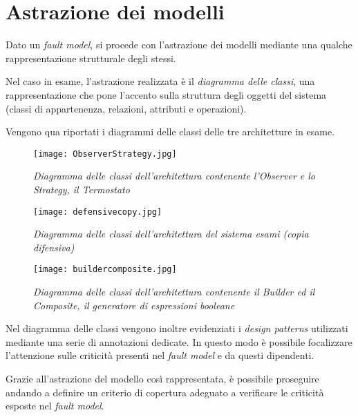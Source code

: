 \section{Astrazione dei modelli}

Dato un \emph{fault model}, si procede con l'astrazione dei modelli mediante una qualche rappresentazione strutturale degli stessi.

Nel caso in esame, l'astrazione realizzata è il \emph{diagramma delle classi}, una rappresentazione che pone l'accento sulla struttura degli oggetti del sistema (classi di appartenenza, relazioni, attributi e operazioni).

Vengono qua riportati i diagrammi delle classi delle tre architetture in esame.

\begin{figure}[h!] 
  \centering
    \texttt{[image: ObserverStrategy.jpg]}
    \caption{{\small \textit{Diagramma delle classi dell'architettura contenente l'Observer e lo Strategy, il Termostato}}}
\end{figure}

\begin{figure}[h!] 
  \centering
    \texttt{[image: defensivecopy.jpg]}
    \caption{{\small \textit{Diagramma delle classi dell'architettura del sistema esami (copia difensiva)}}}
\end{figure}

\begin{figure}[h!] 
  \centering
    \texttt{[image: buildercomposite.jpg]}
    \caption{{\small \textit{Diagramma delle classi dell'architettura contenente il Builder ed il Composite, il generatore di espressioni booleane}}}
\end{figure}

Nel diagramma delle classi vengono inoltre evidenziati i \emph{design patterns} utilizzati mediante una serie di annotazioni dedicate. In questo modo è possibile focalizzare l'attenzione sulle criticità presenti nel \emph{fault model } e da questi dipendenti.

Grazie all'astrazione del modello così rappresentata, è possibile proseguire andando a definire un criterio di copertura adeguato a verificare le criticità esposte nel \emph{fault model}.

